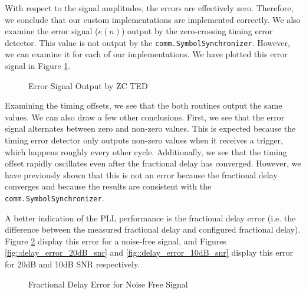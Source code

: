 \documentclass{article}
\begin{document}
\noindent With respect to the signal amplitudes, the errors are effectively zero. Therefore, we conclude that our custom implementations are implemented correctly. We also examine the error signal ($e(n)$) output by the zero-crossing timing error detector. This value is not output by the \texttt{comm.SymbolSynchronizer}. However, we can examine it for each of our implementations.  We have plotted this error signal in Figure \ref{fig::timing_offset}. 

\begin{figure}[H]
	\centerline{}
	\caption{Error Signal Output by ZC TED}
	\label{fig::timing_offset}
\end{figure}

\noindent Examining the timing offsets, we see that the both routines output the same values. We can also draw a few other conclusions. First, we see that the error signal alternates between zero and non-zero values. This is expected because the timing error detector only outputs non-zero values when it receives a trigger, which happens roughly every other cycle. Additionally, we see that the timing offset rapidly oscillates even after the fractional delay has converged. However, we have previously shown that this is not an error because the fractional delay converges and because the results are consistent with the \texttt{comm.SymbolSynchronizer}.

A better indication of the PLL performance is the fractional delay error (i.e. the difference between the measured fractional delay and configured fractional delay). Figure \ref{fig::delay_error_no_noise} display this error for a noise-free signal, and Figures \ref{fig::delay_error_20dB_snr} and \ref{fig::delay_error_10dB_snr} display this error for 20dB and 10dB SNR respectively. 

\begin{figure}[H]
	\centerline{}
	\caption{Fractional Delay Error for Noise Free Signal}
	\label{fig::delay_error_no_noise}
\end{figure}
\end{document}
